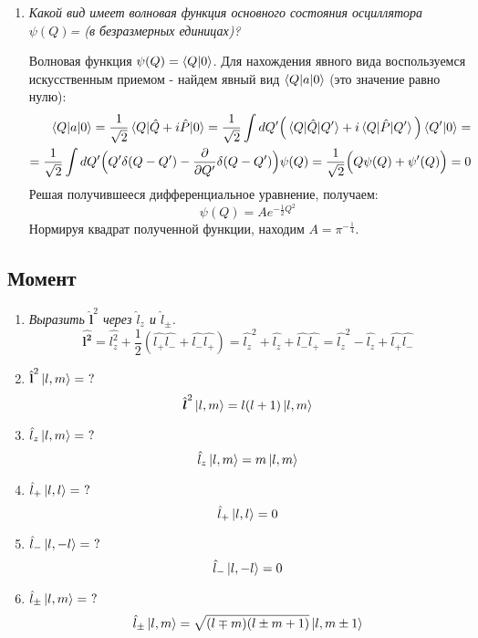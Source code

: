 \documentclass{article}
\begin{document}
\begin{enumerate}
	\item \textit{Какой вид имеет волновая функция основного состояния осциллятора $\psi(Q)$= (в безразмерных единицах)?}
	
	Волновая функция $\psi(Q) = \braket{Q|0}$. Для нахождения явного вида воспользуемся искусственным приемом - найдем явный вид $\braket{Q|a|0}$ (это значение равно нулю):
	\begin{equation}
	\begin{split}
		\braket{Q|a|0} = \frac{1}{\sqrt{2}}\braket{Q|\hat{Q} + i \hat{P}|0} = \frac{1}{\sqrt{2}}\int dQ' \Big( \braket{Q|\hat{Q}|Q'} + i\braket{Q|\hat{P}|Q'} \Big)\braket{Q'|0} = \\ =\frac{1}{\sqrt{2}}\int dQ'\Big(Q'\delta(Q-Q') - \frac{\partial}{\partial Q'}\delta(Q-Q') \Big) \psi(Q) = \frac{1}{\sqrt{2}} \Big(Q\psi(Q) + \psi'(Q)\Big) = 0
	\end{split}
	\end{equation}	
	Решая получившееся дифференциальное уравнение, получаем:
	\begin{equation}
		\psi(Q) = A e^{-\frac{1}{2}Q^2}
	\end{equation}
	Нормируя квадрат полученной функции, находим $A = \pi^{-\frac{1}{4}}$.
\end{enumerate}


\subsection*{Момент}
	\begin{enumerate}
		\item \textit{Выразить $\hat{\textbf{l}}^2$ через $\hat{l}_z$ и $\hat{l}_\pm$.}	
		\begin{equation}
			\hat{\boldsymbol{l^{2}}}=\hat{l_{z}^{2}}+\frac{1}{2}(\hat{l_{+}}\hat{l_{-}}+\hat{l_{-}}\hat{l_{+}})=\hat{l_{z}}^{2}+\hat{l_{z}}+\hat{l_{-}}\hat{l_{+}}=\hat{l_{z}}^{2}-\hat{l_{z}}+\hat{l_{+}}\hat{l_{-}}
		\end{equation}
		\item \textit{$\hat{\textbf{l}}^2 \ket{l, m} = \ ?$}
		\begin{equation}
			\hat{\boldsymbol{l}}^2\ket{l,m}=l(l+1)\ket{l,m}
		\end{equation}			
		\item \textit{$\hat{l}_z \ket{l, m} = \ ?$}
		\begin{equation}
			\hat{l}_z\ket{l,m}=m\ket{l,m}
		\end{equation}	
		\item \textit{$\hat{l}_+ \ket{l, l} = \ ?$}
		\begin{equation}
			\hat{l}_+\ket{l,l}=0
		\end{equation}	
		\item \textit{$\hat{l}_- \ket{l, -l} = \ ?$}
		\begin{equation}
			\hat{l}_-\ket{l,-l}=0
		\end{equation}		
		\item \textit{$\hat{l}_\pm \ket{l, m} = \ ?$}
		\begin{equation}
			\hat{l}_\pm\ket{l,m}=\sqrt{(l\mp m)(l\pm m+1)}\ket{l,m\pm1}
		\end{equation}	
	\end{enumerate}
	
\end{document}

